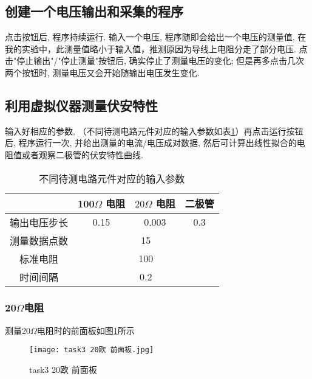 \documentclass[11pt]{article}
\begin{document}
	
	\subsection{创建一个电压输出和采集的程序}
	
	点击按钮后, 程序持续运行. 输入一个电压, 程序随即会给出一个电压的测量值, 在我的实验中，此测量值略小于输入值，推测原因为导线上电阻分走了部分电压. 点击"停止输出"/"停止测量"按钮后, 确实停止了测量电压的变化; 但是再多点击几次两个按钮时, 测量电压又会开始随输出电压发生变化.
	
	\subsection{利用虚拟仪器测量伏安特性}
	
	输入好相应的参数, （不同待测电路元件对应的输入参数如表\ref{tab:base}）再点击运行按钮后, 程序运行一次, 
	并给出测量的电流/电压成对数据, 然后可计算出线性拟合的电阻值或者观察二极管的伏安特性曲线.
	
	\begin{table}[htbp]
		\centering
		\caption{不同待测电路元件对应的输入参数}
		\label{tab:base}
		\begin{tabular}{|c|c|c|c|}
			\hline
			& 100$\Omega$ 电阻  & $20 \Omega$ 电阻  & 二极管 \bigstrut\\
			\hline
			输出电压步长 & 0.15   & 0.003   & 0.3 \bigstrut\\
			\hline
			测量数据点数 & \multicolumn{3}{c|}{15} \bigstrut\\
			\hline
			标准电阻   & \multicolumn{3}{c|}{100} \bigstrut\\
			\hline
			时间间隔   & \multicolumn{3}{c|}{0.2} \bigstrut\\
			\hline
		\end{tabular}%
	\end{table}%
	
	\subsubsection{20$\Omega$电阻}
	测量20$\Omega$电阻时的前面板如图\ref{fig:task3 20欧 前面板}所示
	
	\begin{figure}[htbp]
		\centering
		\texttt{[image: task3 20欧 前面板.jpg]}
		\caption{task3 20欧 前面板}
		\label{fig:task3 20欧 前面板}
	\end{figure}
	
\end{document}
